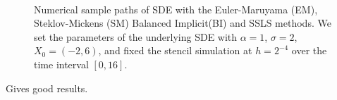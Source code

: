\begin{figure}[h!]
	\centering
	\\
	\caption{Numerical sample paths of SDE 
		with the Euler-Maruyama (EM), Steklov-Mickens (SM) Balanced Implicit(BI) and SSLS methods.
		We set the parameters of the underlying SDE with 
		$\alpha = 1$, 
		$\sigma = 2$,
		$X_0 = (-2, 6)$,
		and fixed the stencil simulation at $h = 2^{-4}$ over the time interval $[0,16]$.
	}
	\label{fig:SimplifyedDuffingVanDerPolSDE}
\end{figure}
\restoregeometry
Gives good results.

